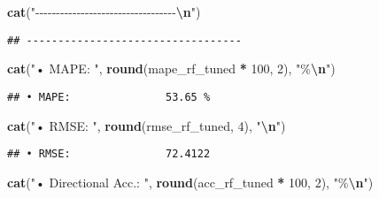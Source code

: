 \documentclass[
]{article}
\newenvironment{Shaded}{\begin{snugshade}}{\end{snugshade}}
\newcommand{\DecValTok}[1]{\textcolor[rgb]{0.00,0.00,0.81}{#1}}
\newcommand{\FunctionTok}[1]{\textcolor[rgb]{0.13,0.29,0.53}{\textbf{#1}}}
\newcommand{\NormalTok}[1]{#1}
\newcommand{\SpecialCharTok}[1]{\textcolor[rgb]{0.81,0.36,0.00}{\textbf{#1}}}
\newcommand{\StringTok}[1]{\textcolor[rgb]{0.31,0.60,0.02}{#1}}
\begin{document}
\begin{Shaded}
\begin{Highlighting}[]
\FunctionTok{cat}\NormalTok{(}\StringTok{"{-}{-}{-}{-}{-}{-}{-}{-}{-}{-}{-}{-}{-}{-}{-}{-}{-}{-}{-}{-}{-}{-}{-}{-}{-}{-}{-}{-}{-}{-}{-}{-}{-}{-}}\SpecialCharTok{\textbackslash{}n}\StringTok{"}\NormalTok{)}
\end{Highlighting}
\end{Shaded}

\begin{verbatim}
## ----------------------------------
\end{verbatim}

\begin{Shaded}
\begin{Highlighting}[]
\FunctionTok{cat}\NormalTok{(}\StringTok{"• MAPE:              "}\NormalTok{, }\FunctionTok{round}\NormalTok{(mape\_rf\_tuned }\SpecialCharTok{*} \DecValTok{100}\NormalTok{, }\DecValTok{2}\NormalTok{), }\StringTok{"\%}\SpecialCharTok{\textbackslash{}n}\StringTok{"}\NormalTok{)}
\end{Highlighting}
\end{Shaded}

\begin{verbatim}
## • MAPE:               53.65 %
\end{verbatim}

\begin{Shaded}
\begin{Highlighting}[]
\FunctionTok{cat}\NormalTok{(}\StringTok{"• RMSE:              "}\NormalTok{, }\FunctionTok{round}\NormalTok{(rmse\_rf\_tuned, }\DecValTok{4}\NormalTok{), }\StringTok{"}\SpecialCharTok{\textbackslash{}n}\StringTok{"}\NormalTok{)}
\end{Highlighting}
\end{Shaded}

\begin{verbatim}
## • RMSE:               72.4122
\end{verbatim}

\begin{Shaded}
\begin{Highlighting}[]
\FunctionTok{cat}\NormalTok{(}\StringTok{"• Directional Acc.:  "}\NormalTok{, }\FunctionTok{round}\NormalTok{(acc\_rf\_tuned }\SpecialCharTok{*} \DecValTok{100}\NormalTok{, }\DecValTok{2}\NormalTok{), }\StringTok{"\%}\SpecialCharTok{\textbackslash{}n}\StringTok{"}\NormalTok{)}
\end{Highlighting}
\end{Shaded}
\end{document}
